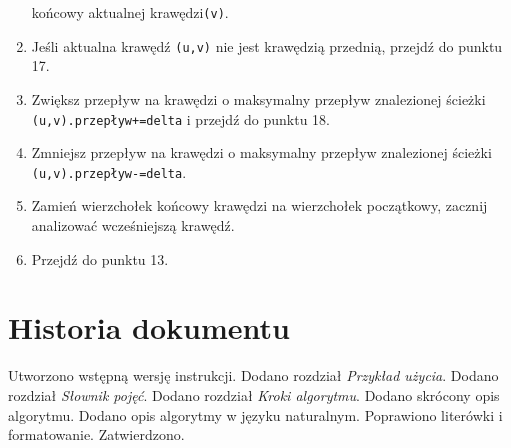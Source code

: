 \documentclass[10pt]{dokument-tiwo}
\begin{document}
\begin{enumerate}
    końcowy aktualnej krawędzi\texttt{(v)}.
    \item%
    Jeśli aktualna krawędź \texttt{(u,v)} nie jest krawędzią przednią, przejdź do
    punktu 17.
    \item%
    Zwiększ przepływ na krawędzi o maksymalny przepływ znalezionej ścieżki
    \texttt{(u,v).przepływ+=delta} i przejdź do punktu 18.
    \item%
    Zmniejsz przepływ na krawędzi o maksymalny przepływ znalezionej ścieżki
    \texttt{(u,v).przepływ-=delta}.
    \item%
    Zamień wierzchołek końcowy krawędzi na wierzchołek początkowy, zacznij
    analizować wcześniejszą krawędź.
    \item%
    Przejdź do punktu 13.
\end{enumerate}


\section{Historia dokumentu}
\begin{versions}
        Utworzono wstępną wersję instrukcji.
        Dodano rozdział \emph{Przykład użycia}.
        Dodano rozdział \emph{Słownik pojęć}.
        Dodano rozdział \emph{Kroki algorytmu}.
        Dodano skrócony opis algorytmu. Dodano opis algorytmy w języku
        naturalnym.
        Poprawiono literówki i formatowanie.
        Zatwierdzono.
\end{versions}
\end{document}
